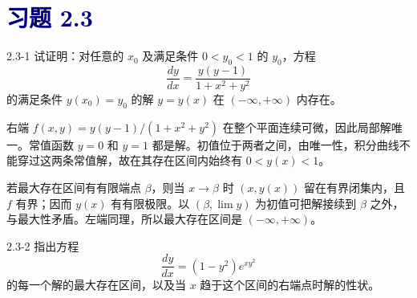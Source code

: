 \documentclass[UTF8,a4paper,11pt]{ctexart}
\newcommand{\sect}[1]{\section*{\textcolor{navy}{习题 #1}}}
\begin{document}
\sect{2.3}
\begin{problem}{2.3-1}
试证明：对任意的 $x_0$ 及满足条件 $0<y_0<1$ 的 $y_0$，方程
  \[
    \frac{dy}{dx}=\frac{y(y-1)}{1+x^2+y^2}
  \]
  的满足条件 $y(x_0)=y_0$ 的解 $y=y(x)$ 在 $(-\infty,+\infty)$ 内存在。
\end{problem}

\begin{solution}
右端 $f(x,y)=y(y-1)/(1+x^2+y^2)$ 在整个平面连续可微，因此局部解唯一。常值函数 $y=0$ 和 $y=1$ 都是解。初值位于两者之间，由唯一性，积分曲线不能穿过这两条常值解，故在其存在区间内始终有 $0<y(x)<1$。

若最大存在区间有有限端点 $\beta$，则当 $x\to\beta$ 时 $(x,y(x))$ 留在有界闭集内，且 $f$ 有界；因而 $y(x)$ 有有限极限。以 $(\beta,\lim y)$ 为初值可把解接续到 $\beta$ 之外，与最大性矛盾。左端同理，所以最大存在区间是 $\boxed{(-\infty,+\infty)}$。
\end{solution}

\begin{problem}{2.3-2}
指出方程
  \[
    \frac{dy}{dx}=(1-y^2)e^{xy^2}
  \]
  的每一个解的最大存在区间，以及当 $x$ 趋于这个区间的右端点时解的性状。
\end{problem}
\end{document}
